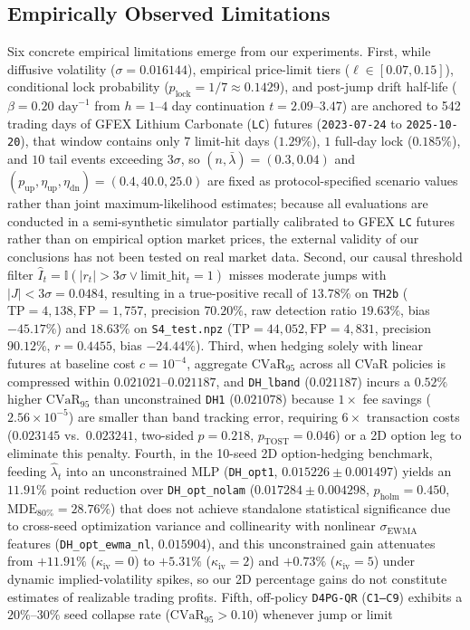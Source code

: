 \documentclass[11pt,a4paper]{article}
\begin{document}
\subsection{Empirically Observed Limitations}
\label{sec:limitations}
Six concrete empirical limitations emerge from our experiments. First, while diffusive volatility ($\sigma = 0.016144$), empirical price-limit tiers ($\ell \in [0.07, 0.15]$), conditional lock probability ($p_{\text{lock}} = 1/7 \approx 0.1429$), and post-jump drift half-life ($\beta = 0.20\text{ day}^{-1}$ from $h = 1\text{--}4$ day continuation $t = 2.09\text{--}3.47$) are anchored to 542 trading days of GFEX Lithium Carbonate (\texttt{LC}) futures (\texttt{2023-07-24} to \texttt{2025-10-20}), that window contains only $7$ limit-hit days ($1.29\%$), $1$ full-day lock ($0.185\%$), and $10$ tail events exceeding $3\sigma$, so $(n, \bar{\lambda}) = (0.3, 0.04)$ and $(p_{\text{up}}, \eta_{\text{up}}, \eta_{\text{dn}}) = (0.4, 40.0, 25.0)$ are fixed as protocol-specified scenario values rather than joint maximum-likelihood estimates; because all evaluations are conducted in a semi-synthetic simulator partially calibrated to GFEX \texttt{LC} futures rather than on empirical option market prices, the external validity of our conclusions has not been tested on real market data. Second, our causal threshold filter $\hat{I}_t = \mathbb{I}(|r_t| > 3\sigma \lor \text{limit\_hit}_t = 1)$ misses moderate jumps with $|J| < 3\sigma = 0.0484$, resulting in a true-positive recall of $13.78\%$ on \texttt{TH2b} ($\text{TP}=4,138, \text{FP}=1,757$, precision $70.20\%$, raw detection ratio $19.63\%$, bias $-45.17\%$) and $18.63\%$ on \texttt{S4\_test.npz} ($\text{TP}=44,052, \text{FP}=4,831$, precision $90.12\%$, $r = 0.4455$, bias $-24.44\%$). Third, when hedging solely with linear futures at baseline cost $c = 10^{-4}$, aggregate $\text{CVaR}_{95}$ across all CVaR policies is compressed within $0.021021\text{--}0.021187$, and \texttt{DH\_lband} ($0.021187$) incurs a $0.52\%$ higher $\text{CVaR}_{95}$ than unconstrained \texttt{DH1} ($0.021078$) because $1\times$ fee savings ($2.56 \times 10^{-5}$) are smaller than band tracking error, requiring $6\times$ transaction costs ($0.023145$ vs.\ $0.023241$, two-sided $p = 0.218$, $p_{\text{TOST}} = 0.046$) or a 2D option leg to eliminate this penalty. Fourth, in the 10-seed 2D option-hedging benchmark, feeding $\hat{\lambda}_t$ into an unconstrained MLP (\texttt{DH\_opt1}, $0.015226 \pm 0.001497$) yields an $11.91\%$ point reduction over \texttt{DH\_opt\_nolam} ($0.017284 \pm 0.004298$, $p_{\text{holm}} = 0.450$, $\text{MDE}_{80\%} = 28.76\%$) that does not achieve standalone statistical significance due to cross-seed optimization variance and collinearity with nonlinear $\sigma_{\text{EWMA}}$ features (\texttt{DH\_opt\_ewma\_nl}, $0.015904$), and this unconstrained gain attenuates from $+11.91\%$ ($\kappa_{\text{iv}}=0$) to $+5.31\%$ ($\kappa_{\text{iv}}=2$) and $+0.73\%$ ($\kappa_{\text{iv}}=5$) under dynamic implied-volatility spikes, so our 2D percentage gains do not constitute estimates of realizable trading profits. Fifth, off-policy \texttt{D4PG-QR} (\texttt{C1--C9}) exhibits a $20\%\text{--}30\%$ seed collapse rate ($\text{CVaR}_{95} > 0.10$) whenever jump or limit 
\end{document}

